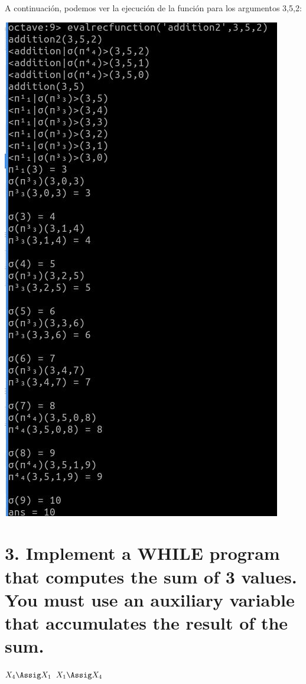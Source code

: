 \documentclass[20pt,oneside]{extbook}
\begin{document}
\newpage 
A continuación, podemos ver la ejecución de la función para los argumentos 3,5,2:

\includegraphics[scale=0.75]{suma'_Octave.jpg}


\section*{3. Implement a WHILE program that computes the sum of 3 values. You
must use an auxiliary variable that accumulates the result of the sum.}


\begin{whilecode}[H]

  $X_4 \Assig X_1$\;
  $X_1 \Assig X_4$\;
\end{whilecode}

\newpage 
\end{document}
